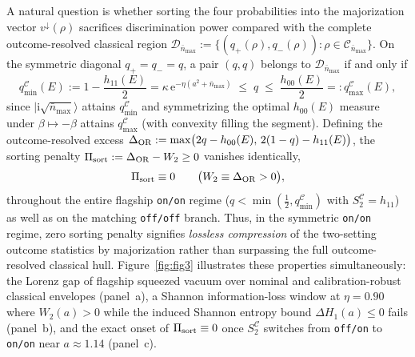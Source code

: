 \documentclass{iopjournal}
\newcommand{\Cset}{\mathcal{C}}
\newcommand{\Dset}{\mathcal{D}}
\newcommand{\nbar}{\bar n_{\max}}
\newcommand{\ket}[1]{\lvert #1\rangle}
\newcommand{\ii}{\mathrm{i}}
\newcommand{\ee}{\mathrm{e}}
\begin{document}
A natural question is whether sorting the four probabilities into the majorization vector $v^\downarrow(\rho)$ sacrifices discrimination power compared with the complete outcome-resolved classical region $\Dset_{\nbar} := \{(q_+(\rho), q_-(\rho)) : \rho \in \Cset_{\nbar}\}$. On the symmetric diagonal $q_+ = q_- = q$, a pair $(q,q)$ belongs to $\Dset_{\nbar}$ if and only if
\begin{equation}\label{eq:diagonal-hull}
q_{\min}^{\Cset}(E) := 1 - \frac{h_{11}(E)}{2} = \kappa\,\ee^{-\eta(a^2+\nbar)} \;\le\; q \;\le\; \frac{h_{00}(E)}{2} =: q_{\max}^{\Cset}(E),
\end{equation}
since $\ket{\ii\sqrt{\nbar}}$ attains $q_{\min}^{\Cset}$ and symmetrizing the optimal $h_{00}(E)$ measure under $\beta \mapsto -\beta$ attains $q_{\max}^{\Cset}$ (with convexity filling the segment). Defining the outcome-resolved excess $\Delta_{\rm OR} := \max\bigl(2q - h_{00}(E),\, 2(1-q) - h_{11}(E)\bigr)$, the sorting penalty $\Pi_{\rm sort} := \Delta_{\rm OR} - W_2 \ge 0$ vanishes identically,
\begin{equation}\label{eq:zero-penalty}
\Pi_{\rm sort} \equiv 0 \qquad \bigl(W_2 \equiv \Delta_{\rm OR} > 0\bigr),
\end{equation}
throughout the entire flagship \texttt{on/on} regime ($q < \min(\frac{1}{2}, q_{\min}^{\Cset})$ with $S_2^{\Cset} = h_{11}$) as well as on the matching \texttt{off/off} branch. Thus, in the symmetric \texttt{on/on} regime, zero sorting penalty signifies \emph{lossless compression} of the two-setting outcome statistics by majorization rather than surpassing the full outcome-resolved classical hull. Figure~\ref{fig:fig3} illustrates these properties simultaneously: the Lorenz gap of flagship squeezed vacuum over nominal and calibration-robust classical envelopes (panel~a), a Shannon information-loss window at $\eta = 0.90$ where $W_2(a) > 0$ while the induced Shannon entropy bound $\Delta H_1(a) \le 0$ fails (panel~b), and the exact onset of $\Pi_{\rm sort} \equiv 0$ once $S_2^{\Cset}$ switches from \texttt{off/on} to \texttt{on/on} near $a \approx 1.14$ (panel~c).
\end{document}
